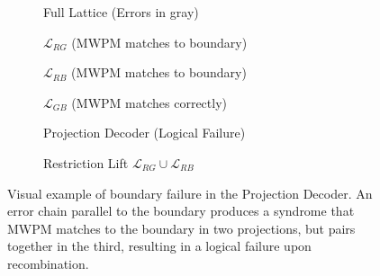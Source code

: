 \documentclass{article}
\begin{document}
\begin{figure}[ht]
    \centering
    \begin{subfigure}{0.45\textwidth}
        \centering
        \resizebox{\textwidth}{!}{}
        \caption{Full Lattice (Errors in gray)}
    \end{subfigure}
    \hfill
    \begin{subfigure}{0.45\textwidth}
        \centering
        \resizebox{\textwidth}{!}{}
        \caption{$\mathcal{L}_{RG}$ (MWPM matches to boundary)}
    \end{subfigure}
    
    \vspace{1cm}
    
    \begin{subfigure}{0.45\textwidth}
        \centering
        \resizebox{\textwidth}{!}{}
        \caption{$\mathcal{L}_{RB}$ (MWPM matches to boundary)}
    \end{subfigure}
    \hfill
    \begin{subfigure}{0.45\textwidth}
        \centering
        \resizebox{\textwidth}{!}{}
        \caption{$\mathcal{L}_{GB}$ (MWPM matches correctly)}
    \end{subfigure}
    \vspace{1cm}
    
    \begin{subfigure}{0.45\textwidth}
        \centering
        \resizebox{\textwidth}{!}{}
        \caption{Projection Decoder (Logical Failure)}
    \end{subfigure}
    \hfill
    \begin{subfigure}{0.45\textwidth}
        \centering
        \resizebox{\textwidth}{!}{}
        \caption{Restriction Lift $\mathcal{L}_{RG} \cup \mathcal{L}_{RB}$}
    \end{subfigure}
    \caption{Visual example of boundary failure in the Projection Decoder. An error chain parallel to the boundary produces a syndrome that MWPM matches to the boundary in two projections, but pairs together in the third, resulting in a logical failure upon recombination.}
\end{figure}
\end{document}
